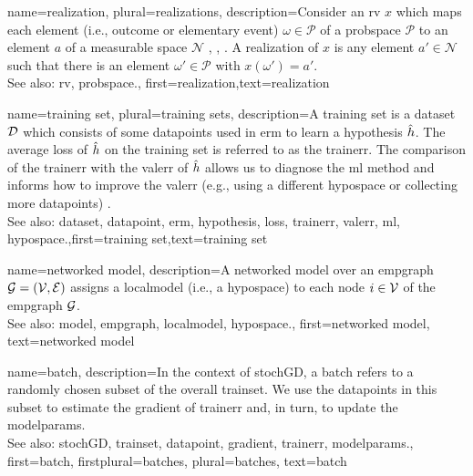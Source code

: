 	
{name={realization}, plural={realizations},
	description={Consider an \gls{rv} $x$ which maps each element 
	(i.e., outcome or elementary event) $\omega \in \mathcal{P}$ of a \gls{probspace} $\mathcal{P}$ 
	to an element $a$ of a measurable space $\mathcal{N}$ \cite{RudinBookPrinciplesMatheAnalysis}, \cite{BillingsleyProbMeasure}, \cite{HalmosMeasure}. 
	A realization of $x$ is any element $a' \in \mathcal{N}$ such that there is 
	an element $\omega' \in \mathcal{P}$ with $x(\omega') = a'$.
			\\
		See also: \gls{rv}, \gls{probspace}.}, first={realization},text={realization}  }

{name={training set}, plural={training sets},
description={A training set is a \gls{dataset} $\mathcal{D}$ which consists of some \glspl{datapoint} used in \gls{erm} 
	to learn a \gls{hypothesis} $\hat{h}$. The average \gls{loss} of $\hat{h}$ on the 
	training set is referred to as the \gls{trainerr}. The comparison of the \gls{trainerr} with the 
	\gls{valerr} of $\hat{h}$ allows us to diagnose the \gls{ml} method and informs how to improve 
	the \gls{valerr} (e.g., using a different \gls{hypospace} or collecting more \glspl{datapoint}) \cite[Sec. 6.6]{MLBasics}.
			\\
		See also: \gls{dataset}, \gls{datapoint}, \gls{erm}, \gls{hypothesis}, \gls{loss}, \gls{trainerr}, \gls{valerr}, \gls{ml}, \gls{hypospace}.},first={training set},text={training set}  
}

{name={networked model},
  description={A networked \gls{model} over an \gls{empgraph} $\mathcal{G} = \left( \mathcal{V},\mathcal{E} \right)$ assigns 
   a \gls{localmodel} (i.e., a \gls{hypospace}) to each node $i \in \mathcal{V}$ of the \gls{empgraph} $\mathcal{G}$.
   		\\
		See also: \gls{model}, \gls{empgraph}, \gls{localmodel}, \gls{hypospace}.}, 
   first={networked model},
   text={networked model}  
}

{name={batch},
 description={In the context of \gls{stochGD}, a batch refers to a randomly 
	chosen subset of the overall \gls{trainset}. We use the \glspl{datapoint} in this subset 
	to estimate the \gls{gradient} of \gls{trainerr} and, in turn, to update the \gls{modelparams}.
			\\
		See also: \gls{stochGD}, \gls{trainset}, \gls{datapoint}, \gls{gradient}, \gls{trainerr}, \gls{modelparams}.}, 
 first={batch},
 firstplural={batches}, 
 plural={batches}, 
 text={batch}  
}

